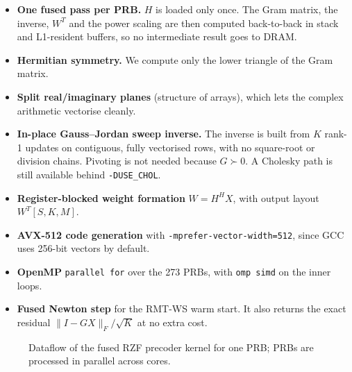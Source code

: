 \begin{itemize}
  \item \textbf{One fused pass per PRB.} $H$ is loaded only once. The Gram matrix, the inverse, $W^T$ and the power scaling are then computed back-to-back in stack and L1-resident buffers, so no intermediate result goes to DRAM.
  \item \textbf{Hermitian symmetry.} We compute only the lower triangle of the Gram matrix.
  \item \textbf{Split real/imaginary planes} (structure of arrays), which lets the complex arithmetic vectorise cleanly.
  \item \textbf{In-place Gauss--Jordan sweep inverse.} The inverse is built from $K$ rank-1 updates on contiguous, fully vectorised rows, with no square-root or division chains. Pivoting is not needed because $G \succ 0$. A Cholesky path is still available behind \texttt{-DUSE\_CHOL}.
  \item \textbf{Register-blocked weight formation} $W = H^H X$, with output layout $W^T[S,K,M]$.
  \item \textbf{AVX-512 code generation} with \texttt{-mprefer-vector-width=512}, since GCC uses 256-bit vectors by default.
  \item \textbf{OpenMP} \texttt{parallel for} over the 273 PRBs, with \texttt{omp simd} on the inner loops.
  \item \textbf{Fused Newton step} for the RMT-WS warm start. It also returns the exact residual $\|I - GX\|_F/\sqrt K$ at no extra cost.
\end{itemize}

\begin{figure}[H]
\centering
{}
\caption{Dataflow of the fused RZF precoder kernel for one PRB; PRBs are processed in parallel across cores.}
\label{fig:kernel}
\end{figure}

